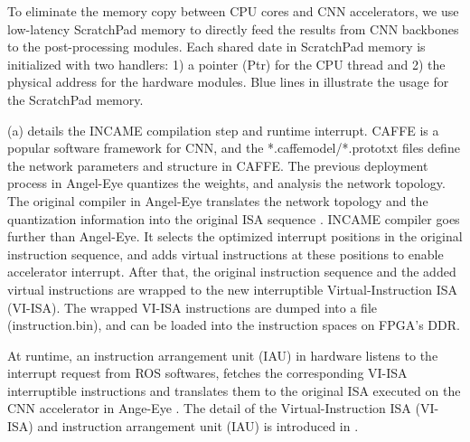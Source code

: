 To eliminate the memory copy between CPU cores and CNN accelerators, we use low-latency ScratchPad memory \cite{Banakar2002Scratchpad} to directly feed the results from CNN backbones to the post-processing modules. Each shared date in ScratchPad memory is initialized with two handlers: 1) a pointer (Ptr) for the CPU thread and 2) the physical address for the hardware modules. Blue lines in  illustrate the usage for the ScratchPad memory.

(a) details the INCAME compilation step and runtime interrupt. CAFFE \cite{jia2014caffe} is a popular software framework for CNN, and the *.caffemodel/*.prototxt files define the network parameters and structure in CAFFE. The previous deployment process in Angel-Eye \cite{guo2017angel} quantizes the weights, and analysis the network topology. The original compiler in Angel-Eye translates the network topology and the quantization information into the original ISA sequence \cite{guo2017angel}. INCAME compiler goes further than Angel-Eye. It selects the optimized interrupt positions in the original instruction sequence, and adds virtual instructions at these positions to enable accelerator interrupt. After that, the original instruction sequence and the added virtual instructions are wrapped to the new interruptible Virtual-Instruction ISA (VI-ISA). The wrapped VI-ISA instructions are dumped into a file (instruction.bin), and can be loaded into the instruction spaces on FPGA's DDR.

At runtime, an instruction arrangement unit (IAU) in hardware listens to the interrupt request from ROS softwares, fetches the corresponding VI-ISA interruptible instructions and translates them to the original ISA executed on the CNN accelerator in Ange-Eye \cite{guo2017angel}. 
The detail of the Virtual-Instruction ISA (VI-ISA) and instruction arrangement unit (IAU) is introduced in .